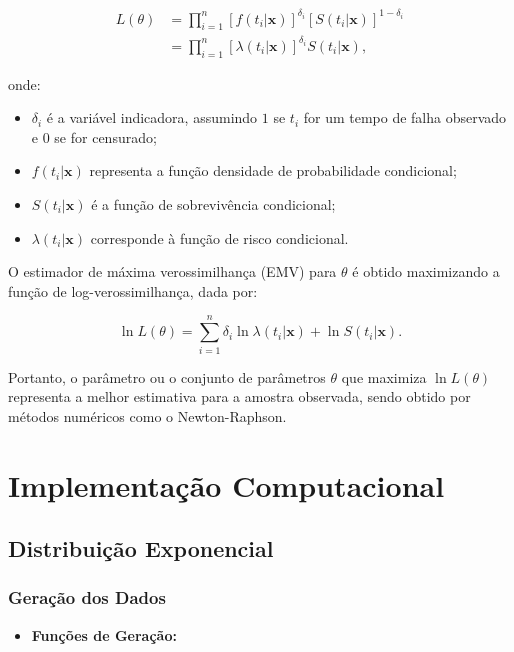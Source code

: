 \documentclass[
  12pt,
  letterpaper,
  DIV=11,
  numbers=noendperiod]{scrreprt}
\providecommand{\tightlist}{%
  \setlength{\itemsep}{0pt}\setlength{\parskip}{0pt}}\usepackage{longtable,booktabs,array}
\begin{document}
\begin{align*}
L(\theta) & = \prod_{i = 1}^{n} \left[f(t_{i} | \mathbf{x}) \right]^{\delta_{i}} \left[S(t_{i} | \mathbf{x}) \right]^{1 - \delta_{i}} \\
          & = \prod_{i = 1}^{n} \left[\lambda(t_{i} | \mathbf{x}) \right]^{\delta_{i}} S(t_{i} | \mathbf{x}),
\end{align*}

onde:

\begin{itemize}
\tightlist
\item
  \(\delta_{i}\) é a variável indicadora, assumindo \(1\) se \(t_{i}\)
  for um tempo de falha observado e \(0\) se for censurado;
\item
  \(f(t_{i}|\mathbf{x})\) representa a função densidade de probabilidade
  condicional;
\item
  \(S(t_{i}|\mathbf{x})\) é a função de sobrevivência condicional;
\item
  \(\lambda(t_{i}|\mathbf{x})\) corresponde à função de risco
  condicional.
\end{itemize}

O estimador de máxima verossimilhança (EMV) para \(\theta\) é obtido
maximizando a função de log-verossimilhança, dada por:

\[
\ln{L(\theta)} = \sum_{i = 1}^{n} \delta_{i} \ln{\lambda(t_{i}|\mathbf{x})} + \ln{S(t_{i}|\mathbf{x})}.
\]

Portanto, o parâmetro ou o conjunto de parâmetros \(\theta\) que
maximiza \(\ln{L(\theta)}\) representa a melhor estimativa para a
amostra observada, sendo obtido por métodos numéricos como o
Newton-Raphson.

\section{Implementação
Computacional}\label{implementauxe7uxe3o-computacional}

\subsection{Distribuição
Exponencial}\label{distribuiuxe7uxe3o-exponencial-1}

\subsubsection{Geração dos Dados}\label{gerauxe7uxe3o-dos-dados}

\begin{itemize}
\tightlist
\item
  \textbf{Funções de Geração:}
\end{itemize}
\end{document}
